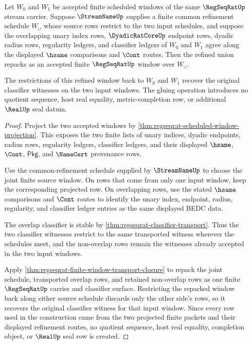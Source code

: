 \begin{theorem}
\label{thm:regseqrat-refined-window-gluing}
Let $W_0$ and $W_1$ be accepted finite scheduled windows of the same $\RegSeqRatUp$ stream carrier. Suppose $\StreamNameUp$ supplies a finite common refinement schedule $W_\cup$ whose source rows restrict to the two input schedules, and suppose the overlapping unary index rows, $\DyadicRatCoreUp$ endpoint rows, dyadic radius rows, regularity ledgers, and classifier ledgers of $W_0$ and $W_1$ agree along the displayed $\hsame$ comparisons and $\Cont$ routes. Then the refined union repacks as an accepted finite $\RegSeqRatUp$ window over $W_\cup$.

The restrictions of this refined window back to $W_0$ and $W_1$ recover the original classifier witnesses on the two input windows. The gluing operation introduces no quotient sequence, host real equality, metric-completion row, or additional $\RealUp$ seal datum.
\end{theorem}
\begin{proof}
Project the two accepted windows by \autoref{thm:regseqrat-scheduled-window-projection}. This exposes the two finite lists of unary indices, dyadic endpoints, radius rows, regularity ledgers, classifier ledgers, and their displayed $\hsame$, $\Cont$, $\mathsf{Pkg}$, and $\NameCert$ provenance rows.

Use the common-refinement schedule supplied by $\StreamNameUp$ to choose the joint finite source window. On rows that come from only one input window, keep the corresponding projected row. On overlapping rows, use the stated $\hsame$ comparisons and $\Cont$ routes to identify the unary index, endpoint, radius, regularity, and classifier ledger entries as the same displayed BEDC data.

The overlap classifier is stable by \autoref{thm:regseqrat-classifier-transport}. Thus the two classifier witnesses restrict to the same transported witness wherever the schedules meet, and the non-overlap rows remain the witnesses already accepted in the two input windows.

Apply \autoref{thm:regseqrat-finite-window-transport-closure} to repack the joint schedule, transported overlap rows, and retained non-overlap rows as one finite $\RegSeqRatUp$ carrier and classifier surface. Restricting the repacked window back along either source schedule discards only the other side's rows, so it recovers the original classifier witness for that input window. Since every row used in the construction came from the two projected finite packets and their displayed refinement routes, no quotient sequence, host real equality, completion object, or $\RealUp$ seal row is created.
\end{proof}

